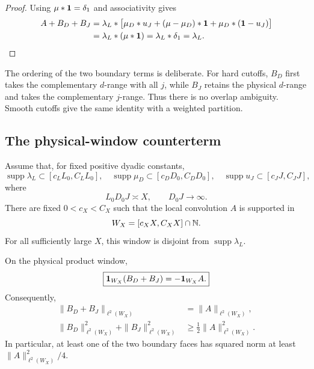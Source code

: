 \begin{proof}
Using \(\mu*\mathbf 1=\delta_1\) and associativity gives
\begin{align*}
 A+B_D+B_J
 &=\lambda_L*
 \bigl[
   \mu_D*u_J+(\mu-\mu_D)*\mathbf 1
   +\mu_D*(\mathbf 1-u_J)
 \bigr]\\
 &=\lambda_L*(\mu*\mathbf 1)
 =\lambda_L*\delta_1
 =\lambda_L.
\end{align*}
\end{proof}

The ordering of the two boundary terms is deliberate.  For hard
cutoffs, \(B_D\) first takes the complementary \(d\)-range with all
\(j\), while \(B_J\) retains the physical \(d\)-range and takes the
complementary \(j\)-range.  Thus there is no overlap ambiguity.  Smooth
cutoffs give the same identity with a weighted partition.

\subsection{The physical-window counterterm}

Assume that, for fixed positive dyadic constants,
\begin{equation}
 \operatorname{supp}\lambda_L\subset[c_LL_0,C_LL_0],
 \quad
 \operatorname{supp}\mu_D\subset[c_DD_0,C_DD_0],
 \quad
 \operatorname{supp}u_J\subset[c_JJ,C_JJ],
 \label{eq:tpc42-counterterm-supports}
\end{equation}
where
\begin{equation}
 L_0D_0J\asymp X,
 \qquad
 D_0J\longrightarrow\infty.
 \label{eq:tpc42-counterterm-product-scale}
\end{equation}
There are fixed \(0<c_X<C_X\) such that the local convolution \(A\) is
supported in
\begin{equation}
 W_X=[c_XX,C_XX]\cap\mathbb N.
 \label{eq:tpc42-counterterm-window}
\end{equation}
For all sufficiently large \(X\), this window is disjoint from
\(\operatorname{supp}\lambda_L\).

\begin{corollary}
\label{cor:tpc42-physical-window-counterterm}
On the physical product window,
\begin{equation}
 \boxed{
  \mathbf 1_{W_X}(B_D+B_J)=-\mathbf 1_{W_X}A.}
 \label{eq:tpc42-physical-window-counterterm}
\end{equation}
Consequently,
\begin{align}
 \|B_D+B_J\|_{\ell^2(W_X)}
 &=\|A\|_{\ell^2(W_X)},
 \label{eq:tpc42-counterterm-norm-equality}\\
 \|B_D\|_{\ell^2(W_X)}^2
 +\|B_J\|_{\ell^2(W_X)}^2
 &\ge \frac12\|A\|_{\ell^2(W_X)}^2.
 \label{eq:tpc42-counterterm-face-energy}
\end{align}
In particular, at least one of the two boundary faces has squared norm at
least \(\|A\|_{\ell^2(W_X)}^2/4\).
\end{corollary}

